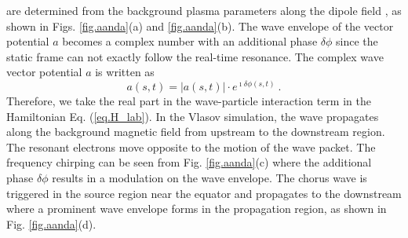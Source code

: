 are determined from the background plasma parameters along the dipole field \cite{zheng2024,zheng2023b}, 
as shown in Figs. \ref{fig.aanda}(a) and \ref{fig.aanda}(b).
The  wave envelope of the vector potential $a$ becomes a complex number with an additional phase $\delta \phi$ since the static frame can not exactly follow the real-time resonance. 
The complex wave vector potential $a$ is written as 
\begin{equation}
    a(s,t) = |a(s,t)| \cdot e^{\imath \delta \phi(s,t)}~.
\end{equation}
Therefore, we take the real part in the wave-particle interaction term in the  Hamiltonian Eq. (\ref{eq.H_lab}).
In the Vlasov simulation,
 the wave propagates along the background magnetic field from upstream to the downstream region.
The resonant electrons 
move opposite to the motion of the wave packet.  
The frequency chirping can be seen from Fig. \ref{fig.aanda}(c) where the additional phase $\delta \phi$ results in a modulation on the wave envelope.
The chorus wave is triggered in the source region near the equator and propagates to the downstream where a prominent wave envelope forms in the propagation region, as shown in Fig. \ref{fig.aanda}(d).

